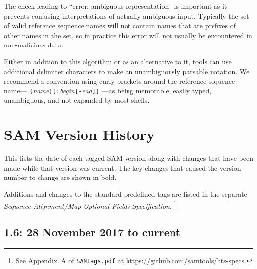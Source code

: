 \documentclass[10pt]{article}
\begin{document}
\begin{appendices}
\noindent
The check leading to ``{\sf error: ambiguous representation}'' is important as it prevents confusing interpretations of actually ambiguous input.
Typically the set of valid reference sequence names will not contain names that are prefixes of other names in the set, so in practice this error will not usually be encountered in non-malicious data.

Either in addition to this algorithm or as an alternative to it, tools can use additional delimiter characters to make an unambiguously parsable notation.
We recommend a convention using curly brackets around the reference sequence name--- \verb"{"\emph{name}\verb"}"{\tt [:}\emph{begin}{\tt [-}\emph{end}{\tt ]]} ---as being memorable, easily typed, unambiguous, and not expanded by most shells.

\section{SAM Version History}\label{sec:history}

This lists the date of each tagged SAM version along with changes that
have been made while that version was current.  The key changes
that caused the version number to change are shown in bold.

Additions and changes to the standard predefined tags are listed in the
separate {\sl Sequence Alignment/Map Optional Fields Specification}.%
\footnote{See Appendix~A of
\href{http://samtools.github.io/hts-specs/SAMtags.pdf}{\tt SAMtags.pdf}
at \url{https://github.com/samtools/hts-specs}.}

\subsection*{1.6: 28 November 2017 to current}


\end{appendices}
\end{document}
